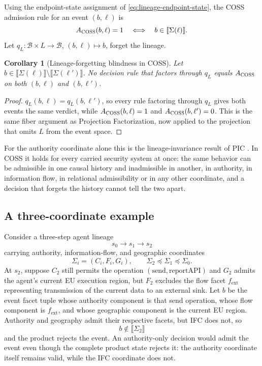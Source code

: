 \documentclass[10pt,twocolumn]{article}
\newcommand{\Model}{\textnormal{\textsc{COSS}}\xspace}
\newcommand{\sem}[1]{\llbracket #1 \rrbracket}
\newcommand{\state}{\Sigma}
\newtheorem{corollary}{Corollary}
\begin{document}
Using the endpoint-state assignment of \eqref{eq:lineage-endpoint-state}, the
\Model admission rule for an event $(b,\ell)$ is
\begin{equation}
  A_{\Model}(b,\ell)=1
  \quad\Longleftrightarrow\quad
  b\in\sem{\state(\ell)}.
\end{equation}
Let $q_L:\mathcal{B}\times L\to\mathcal{B}$, $(b,\ell)\mapsto b$, forget
the lineage.

\begin{corollary}[Lineage-forgetting blindness in \Model]
\label{cor:coss-lineage}
Let $b\in\sem{\state(\ell)}\setminus\sem{\state(\ell')}$. No decision rule
that factors through $q_L$ equals $A_{\Model}$ on both $(b,\ell)$ and
$(b,\ell')$.
\end{corollary}

\begin{proof}
$q_L(b,\ell)=q_L(b,\ell')$, so every rule factoring through $q_L$ gives
both events the same verdict, while $A_{\Model}(b,\ell)=1$ and
$A_{\Model}(b,\ell')=0$. This is the same fiber argument as Projection
Factorization, now applied to the projection that omits $L$ from the event
space.
\end{proof}

For the authority coordinate alone this is the lineage-invariance result
of PIC \cite{gallo_poc2026}. In \Model it holds for every carried security
system at once: the same behavior can be admissible in one causal history
and inadmissible in another, in authority, in information flow, in
relational admissibility or in any other coordinate, and a decision that
forgets the history cannot tell the two apart.

\subsection{A three-coordinate example}
Consider a three-step agent lineage
\begin{equation}
  s_0\to s_1\to s_2
\end{equation}
carrying authority, information-flow, and geographic coordinates
\begin{equation}
  \state_i=(C_i,F_i,G_i),
  \qquad
  \state_2\preceq\state_1\preceq\state_0.
\end{equation}
At $s_2$, suppose $C_2$ still permits the operation
$(\mathrm{send},\mathrm{reportAPI})$ and $G_2$ admits the agent's current EU
execution region, but $F_2$ excludes the flow facet $f_{\mathrm{ext}}$
representing transmission of the current data to an external sink. Let $b$ be
the event facet tuple whose authority component is that send operation, whose
flow component is $f_{\mathrm{ext}}$, and whose geographic component is the
current EU region. Authority and geography admit their respective facets, but
IFC does not, so
\begin{equation}
  b\notin\sem{\state_2}
\end{equation}
and the product rejects the event. An authority-only decision would admit the
event even though the complete product state rejects it: the authority
coordinate itself remains valid, while the IFC coordinate does not.
\end{document}
